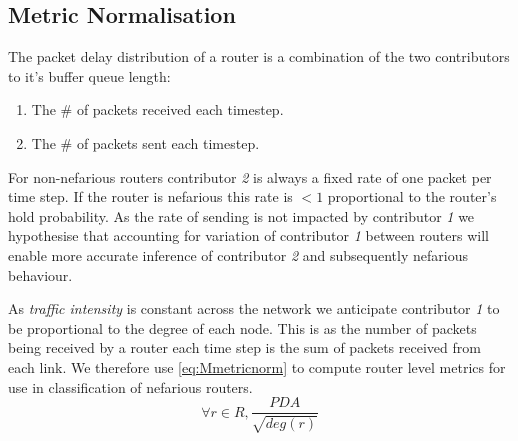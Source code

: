 \subsection{Metric Normalisation}
\label{ssec:Mmetricnormilisation}
The packet delay distribution of a router is a combination of the two contributors to it's buffer queue length:
\begin{enumerate}
    \item The \# of packets received each timestep.
    \item The \# of packets sent each timestep.
\end{enumerate}
For non-nefarious routers contributor \emph{2} is always a fixed rate of one packet per time step. If the router is nefarious this rate is $<1$ proportional to the router's hold probability. As the rate of sending is not impacted by contributor \emph{1} we hypothesise that accounting for variation of contributor \emph{1} between routers will enable more accurate inference of contributor \emph{2} and subsequently nefarious behaviour.\par
As \textit{traffic intensity} is constant across the network we anticipate contributor \emph{1} to be proportional to the degree of each node. This is as the number of packets being received by a router each time step is the sum of packets received from each link. We therefore use \cref{eq:Mmetricnorm} to compute router level metrics for use in classification of nefarious routers.
\begin{equation}
    \label{eq:Mmetricnorm}
    \forall r\in R, \frac{PDA}{\sqrt{deg(r)}}
\end{equation}


